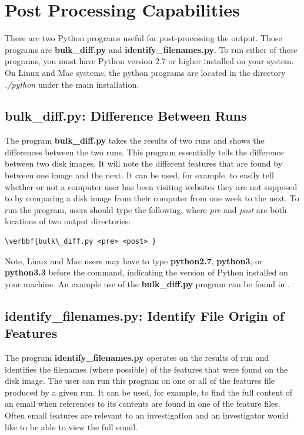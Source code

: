 \documentclass[11pt]{article} %
\begin{document}
\section{Post Processing Capabilities}
\label{PostProcessing}
There are two Python programs useful for post-processing the \bulk output. Those programs are \textbf{bulk\_diff.py} and \textbf{identify\_filenames.py}. To run either of these programs, you must have Python version 2.7 or higher installed on your system. On Linux and Mac systems, the \bulk python programs are located in the directory \textit{./python} under the main \bulk installation. \\

\subsection{bulk\_diff.py: Difference Between Runs}
The program \textbf{bulk\_diff.py} takes the results of two \bulk runs and shows the differences between the two runs. This program essentially tells the difference between two disk images. It will note the different features that are found by \bulk between one image and the next. It can be used, for example, to easily tell whether or not a computer user has been visiting websites they are not supposed to by comparing a disk image from their computer from one week to the next. To run the program, users should type the following, where \textit{pre} and \textit{post} are both locations of two \bulk output directories:
\begin{Verbatim}[commandchars=\\\{\}]
\verbbf{bulk\_diff.py <pre> <post> }
\end{Verbatim} 
Note, Linux and Mac users may have to type \textbf{python2.7}, \textbf{python3}, or \textbf{python3.3} before the command, indicating the version of Python installed on your machine. An example use of the \textbf{bulk\_diff.py} program can be found in .


\subsection{identify\_filenames.py: Identify File Origin of Features}
The program \textbf{identify\_filenames.py} operates on the results of \bulk run and identifies the filenames (where possible) of the features that were found on the disk image. The user can run this program on one or all of the features file produced by a given run. It can be used, for example, to find the full content of an email when references to its contents are found in one of the feature files. Often email features are relevant to an investigation and an investigator would like to be able to view the full email.\\
\end{document}
